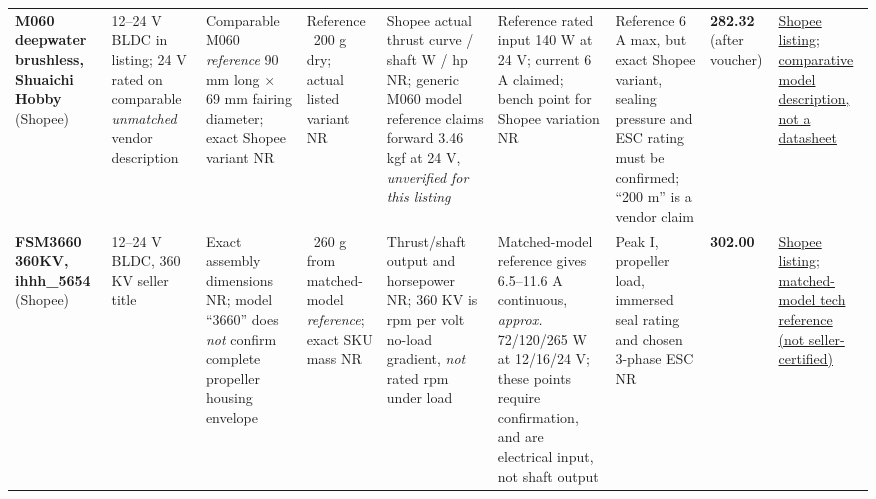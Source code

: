 \documentclass[10pt,a4paper]{article}
\begin{document}
\begin{landscape}
\begin{longtable}{@{}L{31mm}L{25mm}L{27mm}L{22mm}L{30mm}L{31mm}L{28mm}L{16mm}L{35mm}@{}}
\textbf{M060 deepwater brushless, Shuaichi Hobby} (Shopee) & 12--24 V BLDC in listing; 24 V rated on comparable \emph{unmatched} vendor description & Comparable M060 \emph{reference} 90 mm long $\times$ 69 mm fairing diameter; exact Shopee variant NR & Reference ~200 g dry; actual listed variant NR & Shopee actual thrust curve / shaft W / hp NR; generic M060 model reference claims forward 3.46 kgf at 24 V, \emph{unverified for this listing} & Reference rated input 140 W at 24 V; current 6 A claimed; bench point for Shopee variation NR & Reference 6 A max, but exact Shopee variant, sealing pressure and ESC rating must be confirmed; ``200 m'' is a vendor claim & \textbf{282.32} (after voucher) & \href{https://shopee.com.my/M060-200m-Deepwater-Thruster-Waterproof-Brushless-DC-Motor-ROV-Propulsor-12V-24V-Parts-for-RC-Unmanned-Ship-Underwater-Robot-i.133237764.45758558847}{Shopee listing}; \href{https://www.coupang.com/vp/products/9065031801}{comparative model description, not a datasheet} \\
\textbf{FSM3660 360KV, ihhh\_5654} (Shopee) & 12--24 V BLDC, 360 KV seller title & Exact assembly dimensions NR; model ``3660'' does \emph{not} confirm complete propeller housing envelope & ~260 g from matched-model \emph{reference}; exact SKU mass NR & Thrust/shaft output and horsepower NR; 360 KV is rpm per volt no-load gradient, \emph{not} rated rpm under load & Matched-model reference gives 6.5--11.6 A continuous, \emph{approx.} 72/120/265 W at 12/16/24 V; these points require confirmation, and are electrical input, not shaft output & Peak I, propeller load, immersed seal rating and chosen 3-phase ESC NR & \textbf{302.00} & \href{https://shopee.com.my/FSM3660-360KV-12-24V-Waterproof-Brushless-DC-Motor-with-Propeller-for-Underwater-Thruster-Robot-ROV-Submersible-Motor-i.735054459.40756415835}{Shopee listing}; \href{https://www.3dxr.co.uk/products/hobby-porter-fsm3660-360kv-outrunner-motor-with-mount-and-4-blade-propeller}{matched-model tech reference (not seller-certified)} \\
\end{longtable}

\end{landscape}
\end{document}
